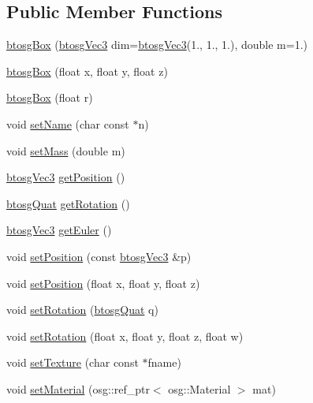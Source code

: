 \subsection*{Public Member Functions}
\begin{DoxyCompactItemize}
\item 
\hyperlink{classbtosgBox_aaffbdeeac3ee040dea98c19b538f0e49}{btosg\+Box} (\hyperlink{classbtosgVec3}{btosg\+Vec3} dim=\hyperlink{classbtosgVec3}{btosg\+Vec3}(1., 1., 1.), double m=1.)
\item 
\hyperlink{classbtosgBox_a0b7809cf498d50ced7c6e4a1bf0f5470}{btosg\+Box} (float x, float y, float z)
\item 
\hyperlink{classbtosgBox_a3b17e84e3f94aabdc7b8517bd802a5c9}{btosg\+Box} (float r)
\item 
void \hyperlink{classbtosgObject_ab06a1b3f357209214c6440cd5746523e}{set\+Name} (char const $\ast$n)
\item 
void \hyperlink{classbtosgObject_a91da93c82d48b86192f0cbb16054fe57}{set\+Mass} (double m)
\item 
\hyperlink{classbtosgVec3}{btosg\+Vec3} \hyperlink{classbtosgObject_a3dadd5da8f2a312e44a039446b93d4cd}{get\+Position} ()
\item 
\hyperlink{classbtosgQuat}{btosg\+Quat} \hyperlink{classbtosgObject_a3b825999ad3a51bde743d4085ff19dae}{get\+Rotation} ()
\item 
\hyperlink{classbtosgVec3}{btosg\+Vec3} \hyperlink{classbtosgObject_a2019ec63bde02b72600450c7c985e77a}{get\+Euler} ()
\item 
void \hyperlink{classbtosgObject_ace6b51040b7ddce90818174200cc6074}{set\+Position} (const \hyperlink{classbtosgVec3}{btosg\+Vec3} \&p)
\item 
void \hyperlink{classbtosgObject_adb9f2cff0faf66dc252cd7c97b11ac84}{set\+Position} (float x, float y, float z)
\item 
void \hyperlink{classbtosgObject_a6365748d5506bb9da31907c9988071fa}{set\+Rotation} (\hyperlink{classbtosgQuat}{btosg\+Quat} q)
\item 
void \hyperlink{classbtosgObject_a4d21ca59b944fd26644db35d3e9ba67a}{set\+Rotation} (float x, float y, float z, float w)
\item 
void \hyperlink{classbtosgObject_aff54acbc7c66811efb0cf2838107a241}{set\+Texture} (char const $\ast$fname)
\item 
void \hyperlink{classbtosgObject_a6ab7b9e0553dab398b980637788b56a8}{set\+Material} (osg\+::ref\+\_\+ptr$<$ osg\+::\+Material $>$ mat)
\item 

\end{DoxyCompactItemize}
